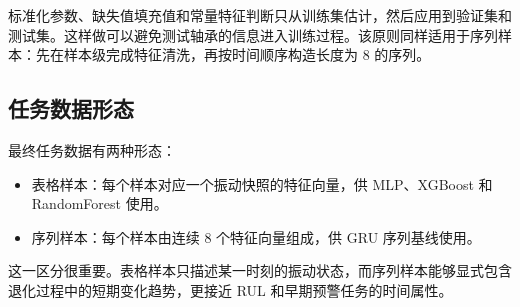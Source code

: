 标准化参数、缺失值填充值和常量特征判断只从训练集估计，然后应用到验证集和测试集。这样做可以避免测试轴承的信息进入训练过程。该原则同样适用于序列样本：先在样本级完成特征清洗，再按时间顺序构造长度为 8 的序列。

\subsection{任务数据形态}

最终任务数据有两种形态：

\begin{itemize}
  \item 表格样本：每个样本对应一个振动快照的特征向量，供 MLP、XGBoost 和 RandomForest 使用。
  \item 序列样本：每个样本由连续 8 个特征向量组成，供 GRU 序列基线使用。
\end{itemize}

这一区分很重要。表格样本只描述某一时刻的振动状态，而序列样本能够显式包含退化过程中的短期变化趋势，更接近 RUL 和早期预警任务的时间属性。
